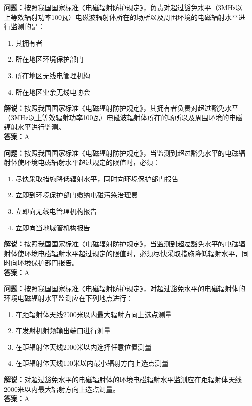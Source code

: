 \documentclass{ctexbook}%
\begin{document}
\textbf{问题：}按照我国国家标准《电磁辐射防护规定》，负责对超过豁免水平（3MHz以上等效辐射功率100瓦）电磁波辐射体所在的场所以及周围环境的电磁辐射水平进行监测的是：
\begin{enumerate}[label=\Alph*), leftmargin=3em]
\item 其拥有者
\item 所在地区环境保护部门
\item 所在地区无线电管理机构
\item 所在地区业余无线电协会
\end{enumerate}
\textbf{解说：}按照我国国家标准《电磁辐射防护规定》，其拥有者负责对超过豁免水平（3MHz以上等效辐射功率100瓦）电磁波辐射体所在的场所以及周围环境的电磁辐射水平进行监测。\\
\textbf{答案：}A

\textbf{问题：}按照我国国家标准《电磁辐射防护规定》，当监测到超过豁免水平的电磁辐射体使环境电磁辐射水平超过规定的限值时，必须：
\begin{enumerate}[label=\Alph*), leftmargin=3em]
\item 尽快采取措施降低辐射水平，同时向环境保护部门报告
\item 立即到环境保护部门缴纳电磁污染治理费
\item 立即向无线电管理机构报告
\item 立即向当地城管机构报告
\end{enumerate}
\textbf{解说：}按照我国国家标准《电磁辐射防护规定》，当监测到超过豁免水平的电磁辐射体使环境电磁辐射水平超过规定的限值时，必须尽快采取措施降低辐射水平，同时向环境保护部门报告。\\
\textbf{答案：}A

\textbf{问题：}按照我国国家标准《电磁辐射防护规定》，对超过豁免水平的电磁辐射体的环境电磁辐射水平监测应在下列地点进行：
\begin{enumerate}[label=\Alph*), leftmargin=3em]
\item 在距辐射体天线2000米以内最大辐射方向上选点测量
\item 在发射机射频输出端口进行测量
\item 在距辐射体天线2000米以内选择任意位置测量
\item 在距辐射体天线100米以内最小辐射方向上选点测量
\end{enumerate}
\textbf{解说：}对超过豁免水平的电磁辐射体的环境电磁辐射水平监测应在距辐射体天线2000米以内最大辐射方向上选点测量。\\
\textbf{答案：}A
\end{document}
